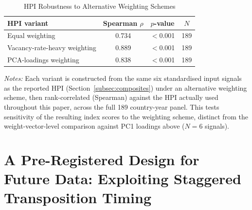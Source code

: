\documentclass[12pt,a4paper]{article}
\begin{document}
\begin{table}[htbp]
\caption{HPI Robustness to Alternative Weighting Schemes}
\label{tab:hpiweightrobustness}
\begin{threeparttable}
\begin{tabular}{lccc}
\toprule
HPI variant & Spearman $\rho$ & $p$-value & $N$ \\
\midrule
Equal weighting            & 0.734 & $<$0.001 & 189 \\
Vacancy-rate-heavy weighting & 0.889 & $<$0.001 & 189 \\
PCA-loadings weighting      & 0.838 & $<$0.001 & 189 \\
\bottomrule
\end{tabular}
\begin{tablenotes}
\footnotesize
\item \textit{Notes:} Each variant is constructed from the same six
  standardised input signals as the reported HPI (Section~\ref{subsec:composites})
  under an alternative weighting scheme, then rank-correlated (Spearman) against
  the HPI actually used throughout this paper, across the full 189 country-year
  panel.  This tests sensitivity of the resulting index scores to the weighting
  scheme, distinct from the weight-vector-level comparison against PC1 loadings
  above ($N=6$ signals).
\end{tablenotes}
\end{threeparttable}
\end{table}

\newpage



\newpage
\section{A Pre-Registered Design for Future Data: Exploiting Staggered
         Transposition Timing}
\label{sec:appendixB}
\end{document}
